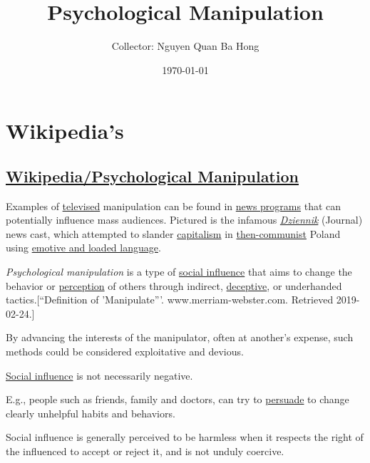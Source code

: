 \documentclass{book}
\title{Psychological Manipulation}
\author{Collector: Nguyen Quan Ba Hong}
\date{\today}
\numberwithin{equation}{section}
\begin{document}
\maketitle
\setcounter{secnumdepth}{6}
\setcounter{tocdepth}{6}
\tableofcontents


\part{Wikipedia's}

\chapter{\href{https://en.wikipedia.org/wiki/Psychological_manipulation}{Wikipedia/Psychological Manipulation}}

\textsf{Examples of \href{https://en.wikipedia.org/wiki/Television}{televised} manipulation can be found in \href{https://en.wikipedia.org/wiki/News_programs}{news programs} that can potentially influence mass audiences. Pictured is the infamous \href{https://en.wikipedia.org/wiki/Dziennik_Telewizyjny}{\textit{Dziennik}} (Journal) news cast, which attempted to slander \href{https://en.wikipedia.org/wiki/Capitalism}{capitalism} in \href{https://en.wikipedia.org/wiki/Polish_People's_Republic}{then-communist} Poland using \href{https://en.wikipedia.org/wiki/Loaded_language}{emotive and loaded language}.}

\textit{Psychological manipulation} is a type of \href{https://en.wikipedia.org/wiki/Social_influence}{social influence} that aims to change the behavior or \href{https://en.wikipedia.org/wiki/Perception}{perception} of others through indirect, \href{https://en.wikipedia.org/wiki/Deceptive}{deceptive}, or underhanded tactics.[``Definition of 'Manipulate'''. www.merriam-webster.com. Retrieved 2019-02-24.]

By advancing the interests of the manipulator, often at another's expense, such methods could be considered exploitative and devious.

%
\href{https://en.wikipedia.org/wiki/Social_influence}{Social influence} is not necessarily negative.

E.g., people such as friends, family and doctors, can try to \href{https://en.wikipedia.org/wiki/Persuade}{persuade} to change clearly unhelpful habits and behaviors.

Social influence is generally perceived to be harmless when it respects the right of the influenced to accept or reject it, and is not unduly coercive.
\end{document}
